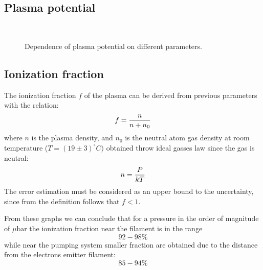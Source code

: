 \documentclass[11pt,a4 paper]{article}
\let\oldfrac\frac
\renewcommand{\frac}[3][d]{\ifthenelse{\equal{#1}{d}}{\oldfrac{#2}{#3}}{\nicefrac{#2}{#3}}}
\begin{document}
\subsection{Plasma potential}
\begin{figure}[H]
\\%
 \caption{Dependence of plasma potential on different parameters.}\label{fig:n}%
\end{figure}

\subsection{Ionization fraction}
The ionization fraction $f$ of the plasma can be derived from previous parameters with the relation:
\[f=\frac n{n+n_0}\]
where $n$ is the plasma density, and $n_0$ is the neutral atom gas density at room temperature ($T=(19\pm3)^\circ C)$ obtained throw ideal gasses law since the gas is neutral:
\[n=\frac P{kT}\]
The error estimation must be considered as an upper bound to the uncertainty, since from the definition follows that $f<1$.

From these graphs we can conclude that for a pressure in the order of magnitude of $\si{\mu\bar}$ the ionization fraction near the filament is in the range
\[92-98\%\]
while near the pumping system smaller fraction are obtained due to the distance from the electrons emitter filament:
\[85-94\%\]
\end{document}
